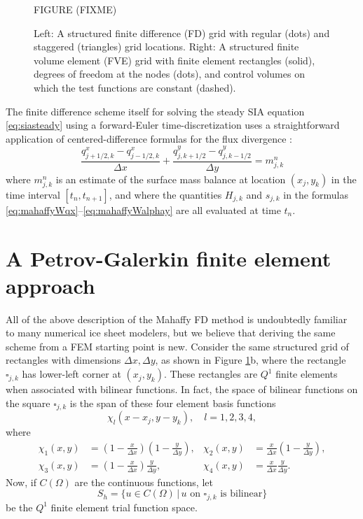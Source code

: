 \documentclass[11pt]{amsart}
\begin{document}
\begin{figure}[ht]
\begin{center}
FIGURE (FIXME)
\end{center}
\caption{Left: A structured finite difference (FD) grid with regular (dots) and staggered (triangles) grid locations.  Right: A structured finite volume element (FVE) grid with finite element rectangles (solid), degrees of freedom at the nodes (dots), and control volumes on which the test functions are constant (dashed).}
\label{fig:fdfemgrids}
\end{figure}

The finite difference scheme itself for solving the steady SIA equation \eqref{eq:siasteady} using a forward-Euler time-discretization uses a straightforward application of centered-difference formulas for the flux divergence \cite{MortonMayers2005}:
\begin{equation}
\frac{q^x_{j+1/2,k} - q^x_{j-1/2,k}}{\Delta x} + \frac{q^y_{j,k+1/2}- q^y_{j,k-1/2}}{\Delta y} = m_{j,k}^n
\end{equation}
where $m_{j,k}^n$ is an estimate of the surface mass balance at location $(x_j,y_k)$ in the time interval $[t_n,t_{n+1}]$, and where the quantities $H_{j,k}$ and $s_{j,k}$ in the formulas \eqref{eq:mahaffyWqx}--\eqref{eq:mahaffyWalphay} are all evaluated at time $t_n$.


\section{A Petrov-Galerkin finite element approach}

All of the above description of the Mahaffy FD method is undoubtedly familiar to many numerical ice sheet modelers, but we believe that deriving the same scheme from a FEM starting point is new.  Consider the same structured grid of rectangles with dimensions $\Delta x,\Delta y$, as shown in Figure \ref{fig:fdfemgrids}b, where the rectangle $\square_{j,k}$ has lower-left corner at $(x_j,y_k)$.  These rectangles are $Q^1$ finite elements when associated with bilinear functions.  In fact, the space of bilinear functions on the square $\square_{j,k}$ is the span of these four element basis functions
\begin{equation}
\chi_l(x-x_j,y-y_k), \quad l=1,2,3,4,
\end{equation}
where
\begin{align*}
\chi_1(x,y) &= \left(1-\tfrac{x}{\Delta x}\right) \left(1-\tfrac{y}{\Delta y}\right), & \chi_2(x,y) &= \tfrac{x}{\Delta x} \left(1-\tfrac{y}{\Delta y}\right), \\
\chi_3(x,y) &= \left(1-\tfrac{x}{\Delta x}\right) \tfrac{y}{\Delta y}, & \chi_4(x,y) &= \tfrac{x}{\Delta x} \tfrac{y}{\Delta y}. 
\end{align*}
Now, if $C(\Omega)$ are the continuous functions, let
\begin{equation}
S_h = \{u \in C(\Omega) \,\big|\, u \text{ on $\square_{j,k}$ is bilinear}\}
\end{equation}
be the $Q^1$ finite element trial function space.
\end{document}

